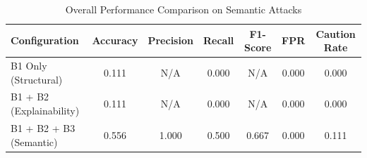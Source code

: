 \begin{table}[h]
\centering
\caption{Overall Performance Comparison on Semantic Attacks}
\label{tab:semantic_results}
\begin{tabular}{lcccccc}
\hline
\textbf{Configuration} & \textbf{Accuracy} & \textbf{Precision} & \textbf{Recall} & \textbf{F1-Score} & \textbf{FPR} & \textbf{Caution Rate} \\ \hline
B1 Only (Structural) & 0.111 & N/A & 0.000 & N/A & 0.000 & 0.000 \\
B1 + B2 (Explainability) & 0.111 & N/A & 0.000 & N/A & 0.000 & 0.000 \\
B1 + B2 + B3 (Semantic) & 0.556 & 1.000 & 0.500 & 0.667 & 0.000 & 0.111 \\
\hline
\end{tabular}
\end{table}
